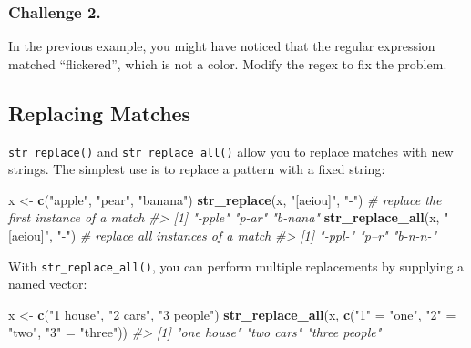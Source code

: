 \documentclass[]{book}
\newenvironment{Shaded}{\begin{snugshade}}{\end{snugshade}}
\newcommand{\KeywordTok}[1]{\textcolor[rgb]{0.13,0.29,0.53}{\textbf{#1}}}
\newcommand{\StringTok}[1]{\textcolor[rgb]{0.31,0.60,0.02}{#1}}
\newcommand{\CommentTok}[1]{\textcolor[rgb]{0.56,0.35,0.01}{\textit{#1}}}
\newcommand{\NormalTok}[1]{#1}
\begin{document}
\subsubsection*{Challenge 2.}\label{challenge-2.-11}

In the previous example, you might have noticed that the regular
expression matched ``flickered'', which is not a color. Modify the regex
to fix the problem.

\subsection{Replacing Matches}\label{replacing-matches}

\texttt{str\_replace()} and \texttt{str\_replace\_all()} allow you to
replace matches with new strings. The simplest use is to replace a
pattern with a fixed string:

\begin{Shaded}
\begin{Highlighting}[]
\NormalTok{x <-}\StringTok{ }\KeywordTok{c}\NormalTok{(}\StringTok{"apple"}\NormalTok{, }\StringTok{"pear"}\NormalTok{, }\StringTok{"banana"}\NormalTok{)}
\KeywordTok{str_replace}\NormalTok{(x, }\StringTok{"[aeiou]"}\NormalTok{, }\StringTok{"-"}\NormalTok{) }\CommentTok{# replace the first instance of a match}
\CommentTok{#> [1] "-pple"  "p-ar"   "b-nana"}
\KeywordTok{str_replace_all}\NormalTok{(x, }\StringTok{"[aeiou]"}\NormalTok{, }\StringTok{"-"}\NormalTok{) }\CommentTok{# replace all instances of a match}
\CommentTok{#> [1] "-ppl-"  "p--r"   "b-n-n-"}
\end{Highlighting}
\end{Shaded}

With \texttt{str\_replace\_all()}, you can perform multiple replacements
by supplying a named vector:

\begin{Shaded}
\begin{Highlighting}[]
\NormalTok{x <-}\StringTok{ }\KeywordTok{c}\NormalTok{(}\StringTok{"1 house"}\NormalTok{, }\StringTok{"2 cars"}\NormalTok{, }\StringTok{"3 people"}\NormalTok{)}
\KeywordTok{str_replace_all}\NormalTok{(x, }\KeywordTok{c}\NormalTok{(}\StringTok{"1"}\NormalTok{ =}\StringTok{ "one"}\NormalTok{, }\StringTok{"2"}\NormalTok{ =}\StringTok{ "two"}\NormalTok{, }\StringTok{"3"}\NormalTok{ =}\StringTok{ "three"}\NormalTok{))}
\CommentTok{#> [1] "one house"    "two cars"     "three people"}
\end{Highlighting}
\end{Shaded}
\end{document}
